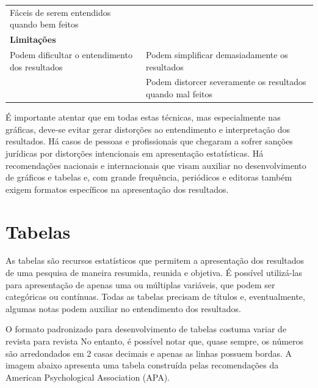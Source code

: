 \documentclass[
]{book}
\begin{document}
\begin{longtable}[]{@{}ll@{}}
\begin{minipage}[t]{0.47\columnwidth}
Fáceis de serem entendidos quando bem feitos\strut
\end{minipage}\tabularnewline
\begin{minipage}[t]{0.47\columnwidth}\raggedright
\textbf{Limitações}\strut
\end{minipage} & \begin{minipage}[t]{0.47\columnwidth}\raggedright
\strut
\end{minipage}\tabularnewline
\begin{minipage}[t]{0.47\columnwidth}\raggedright
Podem dificultar o entendimento dos resultados\strut
\end{minipage} & \begin{minipage}[t]{0.47\columnwidth}\raggedright
Podem simplificar demasiadamente os resultados\strut
\end{minipage}\tabularnewline
\begin{minipage}[t]{0.47\columnwidth}\raggedright
\strut
\end{minipage} & \begin{minipage}[t]{0.47\columnwidth}\raggedright
Podem distorcer severamente os resultados quando mal feitos\strut
\end{minipage}\tabularnewline
\bottomrule
\end{longtable}

É importante atentar que em todas estas técnicas, mas especialmente nas gráficas, deve-se evitar gerar distorções ao entendimento e interpretação dos resultados. Há casos de pessoas e profissionais que chegaram a sofrer sanções jurídicas por distorções intencionais em apresentação estatísticas. Há recomendações nacionais e internacionais que visam auxiliar no desenvolvimento de gráficos e tabelas e, com grande frequência, periódicos e editoras também exigem formatos específicos na apresentação dos resultados.

\hypertarget{tabelas}{%
\section{Tabelas}\label{tabelas}}

As tabelas são recursos estatísticos que permitem a apresentação dos resultados de uma pesquisa de maneira resumida, reunida e objetiva. É possível utilizá-las para apresentação de apenas uma ou múltiplas variáveis, que podem ser categóricas ou contínuas. Todas as tabelas precisam de títulos e, eventualmente, algumas notas podem auxiliar no entendimento dos resultados.

O formato padronizado para desenvolvimento de tabelas costuma variar de revista para revista No entanto, é possível notar que, quase sempre, os números são arredondados em 2 casas decimais e apenas as linhas possuem bordas. A imagem abaixo apresenta uma tabela construída pelas recomendações da American Psychological Association (APA).
\end{document}
